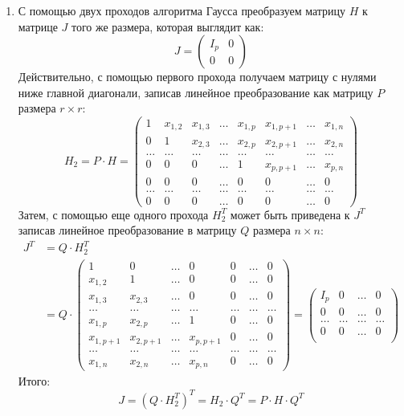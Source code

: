  \begin{enumerate}
 	\item С помощью двух проходов алгоритма Гаусса преобразуем матрицу $H$ к матрице $J$ того же размера,
 	 которая выглядит как:
 	\[
 		J = \begin{pmatrix}
 			I_p & 0 \\
 			0 & 0
 		\end{pmatrix}
 	\] 
 	Действительно, с помощью первого прохода получаем матрицу с нулями ниже главной диагонали,
 	 записав линейное преобразование как матрицу $P$ размера $r \times r$:
 	\[
 		H_2 = P \cdot H = \begin{pmatrix}
 			1 & x_{1,2} & x_{1,3} & \ldots & x_{1,p} & x_{1,p+1} & \ldots & x_{1,n} \\
 			0 & 1 & x_{2,3} & \ldots & x_{2,p} & x_{2,p+1} & \ldots & x_{2,n} \\
 			\ldots & \ldots & \ldots & \ldots & \ldots & \ldots & \ldots & \ldots \\
 			0 & 0 & 0 & \ldots & 1 & x_{p,p+1} & \ldots & x_{p,n} \\ 
 			0 & 0 & 0 & \ldots & 0 & 0 & \ldots & 0 \\ 
 			\ldots & \ldots & \ldots & \ldots & \ldots & \ldots & \ldots & \ldots \\
 			0 & 0 & 0 & \ldots & 0 & 0 & \ldots & 0
 		\end{pmatrix}
 	\]
 	Затем, с помощью еще одного прохода $H_2^T$ может быть приведена к $J^T$ записав линейное преобразование
 	в матрицу $Q$ размера $n \times n$:
 	\[
 	\begin{split}
 		J^T & = Q \cdot H_2^T \\
 		& = Q \cdot \begin{pmatrix}
 			1 & 0 & \ldots & 0 & 0 & \ldots & 0 \\
 			x_{1,2} & 1 & \ldots & 0 & 0 & \ldots & 0 \\
 			x_{1,3} & x_{2,3} & \ldots & 0 & 0 & \ldots & 0 \\
 			\ldots & \ldots & \ldots & \ldots & \ldots & \ldots & \ldots \\
 			x_{1,p} & x_{2,p} & \ldots & 1 & 0 & \ldots & 0 \\
 			x_{1,p+1} & x_{2,p+1} & \ldots & x_{p,p+1} & 0 & \ldots & 0 \\
 			\ldots & \ldots & \ldots & \ldots & \ldots & \ldots & \ldots \\
 			x_{1,n} & x_{2,n} & \ldots & x_{p,n} & 0 & \ldots & 0
 		\end{pmatrix}  = \begin{pmatrix}
 			I_p & 0 & \ldots & 0 \\
 			0 & 0 & \ldots & 0 \\
 			\ldots & \ldots & \ldots & \ldots \\
 			0 & 0 & \ldots & 0 \\
 		\end{pmatrix}
 	\end{split}
 	\]
 	Итого:
 	\[
 		J = (Q \cdot H_2^T)^T = H_2 \cdot Q^T = P \cdot H \cdot Q^T
 	\]
 	

\end{enumerate}
